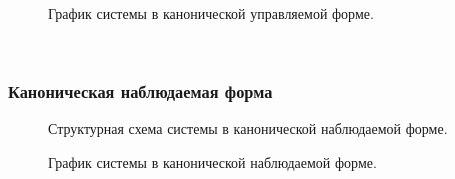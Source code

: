 \documentclass[a5paper, 10pt]{article}
\theoremstyle{definition}
\theoremstyle{plain}
\theoremstyle{remark}
\begin{document}
\begin{figure}[h]
\caption{График системы в канонической управляемой форме.}
\end{figure}

\newpage
\,
\newpage
\subsubsection{Каноническая наблюдаемая форма}

\begin{figure}[h]
\caption{Структурная схема системы в канонической наблюдаемой форме.}
\end{figure}

\begin{figure}[h]
\caption{График системы в канонической наблюдаемой форме.}
\end{figure}
\end{document}
